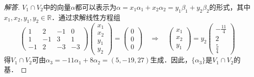\documentclass[a4paper,fontset=windows]{ctexbook}
\theoremstyle{definition}
\begin{document}
\begin{proof}[解答]
$V_1\cap V_2$中的向量$\alpha$都可以表示为$\alpha=x_1\alpha_1+x_2\alpha_2=y_1\beta_1+y_2\beta_2$的形式，其中$x_1,x_2,y_1,y_2\in\mathbb{R}$．通过求解线性方程组
$$\begin{pmatrix}1&2&-1&0 \\ 1&-1&3&1 \\ -1&2&-3&-3\end{pmatrix}\begin{pmatrix}x_1 \\ x_2 \\ y_1 \\ y_2\end{pmatrix}=\begin{pmatrix}0 \\ 0 \\ 0\end{pmatrix}\quad\Rightarrow\quad\begin{pmatrix}x_1 \\ x_2 \\ y_1\end{pmatrix}=y_2\begin{pmatrix}-\frac{11}{4} \\ 2 \\ \frac{5}{4}\end{pmatrix}$$
得$V_1\cap V_2$可由$\alpha_3=-11\alpha_1+8\alpha_2=(5,-19,27)$生成．因此，$\{\alpha_3\}$是$V_1\cap V_2$的基．
\end{proof}
\end{document}
